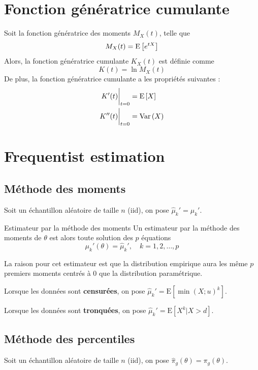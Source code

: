 \documentclass[10pt, french]{article}
\begin{document}
\begin{multicols*}{3}
\setcounter{section}{8}

\columnbreak
\section{Fonction génératrice cumulante}
Soit la fonction génératrice des moments $M_X(t)$, telle que
\[M_X(t) = \mathrm{E} \left[ e^{tX} \right]\]
Alors, la fonction génératrice cumulante $K_X(t)$ est définie comme
\[K(t) = \ln M_X(t)\]
De plus, la fonction génératrice cumulante a les propriétés suivantes : 
\begin{align*}
K'(t) \biggr \rvert_{t = 0} & =   \mathrm{E} \left[ X \right] \\
K''(t) \biggr \rvert_{t=0} & = \mathrm{Var} \left( X \right) \\
\end{align*}

\setcounter{section}{9}
\columnbreak
\section{Frequentist estimation}
\subsection*{Méthode des moments}

Soit un échantillon aléatoire de taille $n$ (iid), on pose $\hat\mu_{k}' = \mu_{k}'$.

\begin{algo}{Estimateur par la méthode des moments}
Un estimateur par la méthode des moments de $\theta$ est alors toute solution des $p$ équations
\begin{equation*}
	\mu_{k}'(\theta) = \hat\mu_{k}', \quad	k = 1, 2, \dots, p
\end{equation*}
\end{algo}

La raison pour cet estimateur est que la distribution empirique aura les même $p$ premiers moments centrés à 0 que la distribution paramétrique.
 

Lorsque les données sont \textbf{censurées}, on pose $\hat\mu_{k}' = \text{E}[\min(X; u)^{k}]$.

Lorsque les données sont \textbf{tronquées}, on pose $\hat\mu_{k}' = \text{E}[X^{k} | X > d]$.


\subsection*{Méthode des percentiles}


Soit un échantillon aléatoire de taille $n$ (iid), on pose $\hat\pi_{g}(\theta) = \pi_{g}(\theta)$.


\end{multicols*}
\end{document}

